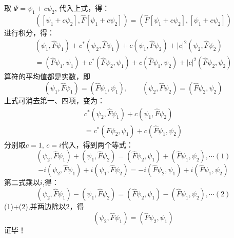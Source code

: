 \begin{frame} [allowframebreaks=]
        取 $\Psi= \psi_1+c\psi_2 $, 代入上式，得：
        $$([\psi_1+c\psi_2],\hat{F} [\psi_1+c\psi_2])=(\hat{F}[\psi_1+c\psi_2],[\psi_1+c\psi_2]) $$
        进行积分，得：
        $$
        \begin{array}{r}
        \left(\psi_{1}, \hat{F} \psi_{1}\right)+c^{*}\left(\psi_{2}, \hat{F} \psi_{1}\right)+c\left(\psi_{1}, \hat{F} \psi_{2}\right)+|c|^{2}\left(\psi_{2}, \hat{F} \psi_{2}\right) \\
        =\left(\hat{F} \psi_{1}, \psi_{1}\right)+c^{*}\left(\hat{F} \psi_{2}, \psi_{1}\right)+c\left(\hat{F} \psi_{1}, \psi_{2}\right)+|c|^{2}\left(\hat{F} \psi_{2}, \psi_{2}\right)
        \end{array}
        $$
        算符的平均值都是实数，即 
        $$(\psi_1,\hat{F}\psi_1)=(\hat{F} \psi_1, \psi_1), \qquad (\psi_2,\hat{F}\psi_2)=(\hat{F} \psi_2, \psi_2) $$
        上式可消去第一、四项，变为：
        $$\begin{array}{r}
            c^{*}\left(\psi_{2}, \hat{F} \psi_{1}\right)+c\left(\psi_{1}, \hat{F} \psi_{2}\right) \\
            =c^{*}\left(\hat{F} \psi_{2}, \psi_{1}\right)+c\left(\hat{F} \psi_{1}, \psi_{2}\right)
        \end{array}$$
        分别取$c=1$, $c=i$代入，得到两个等式：
        $$  \left(\psi_{2}, \hat{F} \psi_{1}\right)+\left(\psi_{1}, \hat{F} \psi_{2}\right) = 
        \left(\hat{F} \psi_{2}, \psi_{1}\right)+\left(\hat{F} \psi_{1}, \psi_{2}\right) , \cdots (1)
        $$
        $$
        -i\left(\psi_{2}, \hat{F} \psi_{1}\right)+i\left(\psi_{1}, \hat{F} \psi_{2}\right) 
        =-i\left(\hat{F} \psi_{2}, \psi_{1}\right)+i\left(\hat{F} \psi_{1}, \psi_{2}\right)
        $$
        第二式乘以$i$,得：
        $$
        \left(\psi_{2}, \hat{F} \psi_{1}\right)-\left(\psi_{1}, \hat{F} \psi_{2}\right) 
        =\left(\hat{F} \psi_{2}, \psi_{1}\right)-\left(\hat{F} \psi_{1}, \psi_{2}\right), \cdots (2)
        $$
        (1)+(2),并两边除以2，得
        $$
        \left(\psi_{2}, \hat{F} \psi_{1}\right) =\left(\hat{F} \psi_{2}, \psi_{1}\right)
        $$
        证毕！
\end{frame} 
